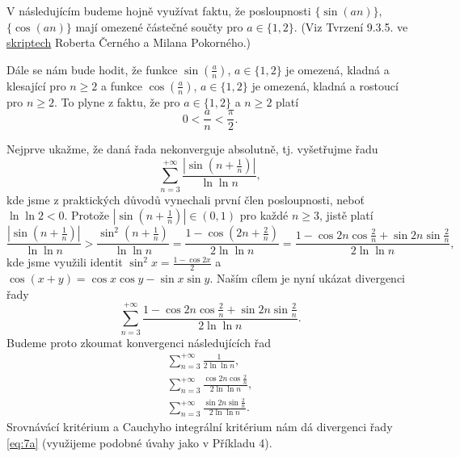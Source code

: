 \documentclass[answers]{exam}
\begin{document}
\begin{questions}
  \begin{solution}
		V následujícím budeme hojně využívat faktu, že posloupnosti $\{ \sin(an) \}$, $\{ \cos(an) \}$ mají omezené částečné součty pro $a \in \{ 1, 2 \}$. (Viz Tvrzení 9.3.5. ve \href{http://www.karlin.mff.cuni.cz/~pokorny/skripta_MAF2.pdf}{skriptech} Roberta Černého a Milana Pokorného.)
		
		Dále se nám bude hodit, že funkce $\sin(\frac{a}{n})$, $a \in \{ 1, 2 \}$ je omezená, kladná a klesající pro $n \ge 2$ a funkce $\cos(\frac{a}{n})$, $a \in \{ 1, 2 \}$ je omezená, kladná a rostoucí pro $n \ge 2$. To plyne z faktu, že pro $a \in \{ 1, 2 \}$ a $n \ge 2$ platí
		\begin{equation*}
			0 < \frac{a}{n} < \frac{\pi}{2}.
		\end{equation*}
  
  	Nejprve ukažme, že daná řada nekonverguje absolutně, tj. vyšetřujme řadu
  	\begin{equation}
  		\label{eq:4}
	     	\sum_{n = 3}^{+\infty}
 				\frac{\left| \sin \left( n + \frac{1}{n} \right) \right|}{\ln \ln n},	
  	\end{equation}
  	kde jsme z praktických důvodů vynechali první člen posloupnosti, neboť $\ln \ln 2 < 0$. Protože $\left| \sin \left( n + \frac{1}{n} \right) \right| \in (0, 1)$ pro každé $n \ge 3$, jistě platí
  	\begin{equation}
  		\label{eq:5}
  		\frac{\left| \sin \left( n + \frac{1}{n} \right) \right|}{\ln \ln n}
  		>
  		\frac{\sin^2 \left( n + \frac{1}{n} \right)}{\ln \ln n}
  		=
  		\frac{1 - \cos \left( 2n + \frac{2}{n} \right)}{2 \ln \ln n}
  		=
  		\frac{
  			1 - \cos 2n \cos \frac{2}{n} + \sin 2n \sin \frac{2}{n}
  		}{
  			2 \ln \ln n
  		},
  	\end{equation}
  	kde jsme využili identit $\sin^2 x = \frac{1 - \cos 2x}{2}$ a $\cos \left( x + y \right) = \cos x \cos y - \sin x \sin y$. Naším cílem je nyní ukázat divergenci řady
  	\begin{equation}
  		\label{eq:6}
  		\sum_{n = 3}^{+\infty}
  		\frac{
  			1 - \cos 2n \cos \frac{2}{n} + \sin 2n \sin \frac{2}{n}
  		}{
  			2 \ln \ln n
  		}.
  	\end{equation}
  	Budeme proto zkoumat konvergenci následujících řad
  	\begin{subequations}
  		\begin{gather}
  		\label{eq:7a}
  		\sum_{n = 3}^{+\infty}
  		\frac{1}{2 \ln \ln n},
  		\\
  		\label{eq:7b}
  		\sum_{n = 3}^{+\infty}
  		\frac{\cos 2n \cos \frac{2}{n}}{2 \ln \ln n}, 		
  		\\
  		\label{eq:7c}
  		\sum_{n = 3}^{+\infty}
  		\frac{\sin 2n \sin \frac{2}{n}}{2 \ln \ln n}.		
  		\end{gather}
  	\end{subequations}
  	Srovnávácí kritérium a Cauchyho integrální kritérium nám dá divergenci řady \eqref{eq:7a} (využijeme podobné úvahy jako v Příkladu 4). 
  	

\end{solution}
\end{questions}
\end{document}
